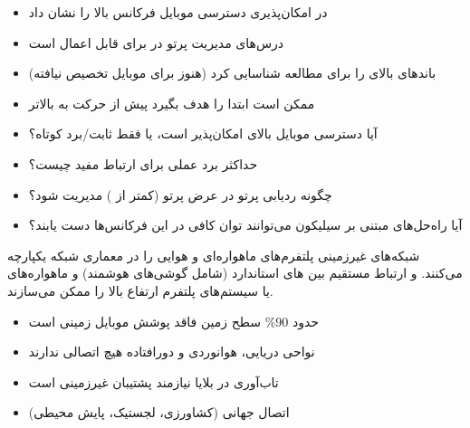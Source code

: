 
\begin{itemize}
\tightlist
\item
   در  امکان‌پذیری دسترسی موبایل فرکانس بالا را نشان داد
\item
  درس‌های مدیریت پرتو  در  برای  قابل اعمال است
\item
   باندهای بالای  را برای مطالعه شناسایی کرد (هنوز برای موبایل تخصیص نیافته)
\item
   ممکن است ابتدا  را هدف بگیرد پیش از حرکت به بالاتر
\end{itemize}


\begin{itemize}
\tightlist
\item
  آیا دسترسی موبایل بالای  امکان‌پذیر است، یا فقط ثابت/\allowbreak{}برد کوتاه؟
\item
  حداکثر برد عملی برای ارتباط مفید چیست؟
\item
  چگونه ردیابی پرتو در عرض پرتو  (کمتر از \lr{\mbox{1\ensuremath{^{\circ}}}}) مدیریت شود؟
\item
  آیا راه‌حل‌های مبتنی بر سیلیکون می‌توانند توان کافی در این فرکانس‌ها دست یابند؟
\end{itemize}



\CNchained{}

\CNchained{}

شبکه‌های غیرزمینی پلتفرم‌های ماهواره‌ای و هوایی را در معماری شبکه  یکپارچه می‌کنند.  و  ارتباط مستقیم بین های استاندارد (شامل گوشی‌های هوشمند) و ماهواره‌های  یا سیستم‌های پلتفرم ارتفاع بالا  را ممکن می‌سازند.


\begin{itemize}
\tightlist
\item
  حدود 90\% سطح زمین فاقد پوشش موبایل زمینی است
\item
  نواحی دریایی، هوانوردی و دورافتاده هیچ اتصالی ندارند
\item
  تاب‌آوری در بلایا نیازمند پشتیبان غیرزمینی است
\item
  اتصال  جهانی (کشاورزی، لجستیک، پایش محیطی)
\end{itemize}

